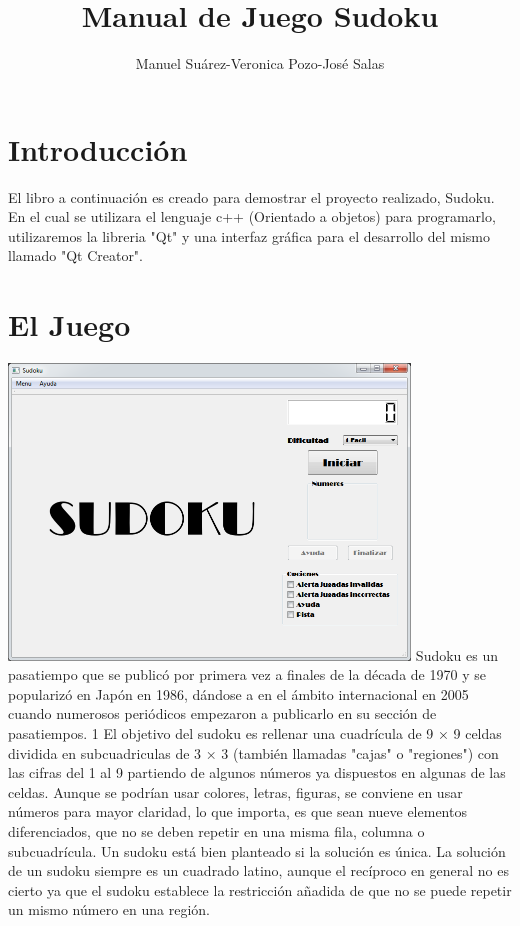 \documentclass[12pt,oneside]{book}
\title{Manual de Juego Sudoku}
\author{Manuel Suárez-Veronica Pozo-José Salas}
\begin{document}
\maketitle
\tableofcontents

\chapter{Introducción}

El libro a continuación es creado para demostrar el proyecto realizado, Sudoku. 
En el cual se utilizara el lenguaje c++ (Orientado a objetos) para programarlo, utilizaremos la libreria "Qt" y una interfaz gráfica para el desarrollo del mismo llamado
"Qt Creator". 


\chapter{El Juego}
	\includegraphics[width=0.8\textwidth]{./imagenes/PantallaPrincipal.png}
	Sudoku es un pasatiempo que se publicó por primera vez a finales de la década de 1970 y se popularizó en Japón en 1986, dándose a 	en el ámbito internacional en 2005 cuando numerosos periódicos empezaron a publicarlo en su sección de pasatiempos. 1 El objetivo del sudoku es rellenar una cuadrícula de 9 × 9 celdas dividida en subcuadriculas de 3 × 3 (también llamadas "cajas" o "regiones") con las cifras del 1 al 9 partiendo de algunos números ya dispuestos en algunas de las celdas. 
	Aunque se podrían usar colores, letras, figuras, se conviene en usar números para mayor claridad, lo que importa, es que sean nueve elementos diferenciados, que no se deben repetir en una misma fila,
	columna o subcuadrícula. Un sudoku está bien planteado si la solución es única. La solución de un sudoku siempre es un cuadrado latino, aunque el recíproco
	en general no es cierto ya que el sudoku establece la restricción añadida de que no se puede repetir un mismo número en una región.
\end{document}
